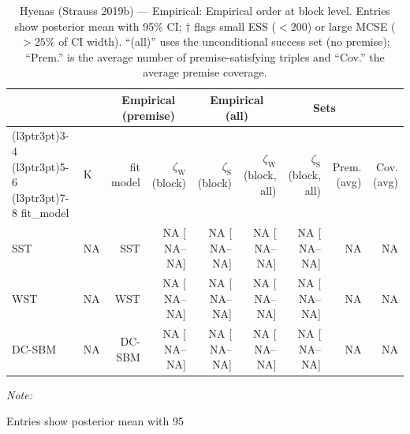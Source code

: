 \begin{table}
\centering
\caption{\label{tab:tab:hyenas-strauss-2019b-empirical-emp-block}Hyenas (Strauss 2019b) — Empirical: Empirical order at block level. Entries show posterior mean with 95\% CI; $\dagger$ flags small ESS ($<200$) or large MCSE ($>25\%$ of CI width). “(all)” uses the unconditional success set (no premise); “Prem.” is the average number of premise-satisfying triples and “Cov.” the average premise coverage.}
\centering
\begin{threeparttable}
\begin{tabular}[t]{llrrrrrrr}
\toprule
\multicolumn{2}{c}{ } & \multicolumn{2}{c}{Empirical (premise)} & \multicolumn{2}{c}{Empirical (all)} & \multicolumn{2}{c}{Sets} \\
\cmidrule(l{3pt}r{3pt}){3-4} \cmidrule(l{3pt}r{3pt}){5-6} \cmidrule(l{3pt}r{3pt}){7-8}
fit_model & K & fit model & $\zeta_{\mathrm{W}}$ (block) & $\zeta_{\mathrm{S}}$ (block) & $\zeta_{\mathrm{W}}$ (block, all) & $\zeta_{\mathrm{S}}$ (block, all) & Prem. (avg) & Cov. (avg)\\
\midrule
SST & NA & SST & NA [  NA--  NA] & NA [  NA--  NA] & NA [  NA--  NA] & NA [  NA--  NA] & NA & NA\\
WST & NA & WST & NA [  NA--  NA] & NA [  NA--  NA] & NA [  NA--  NA] & NA [  NA--  NA] & NA & NA\\
DC-SBM & NA & DC-SBM & NA [  NA--  NA] & NA [  NA--  NA] & NA [  NA--  NA] & NA [  NA--  NA] & NA & NA\\
\bottomrule
\end{tabular}
\begin{tablenotes}
\item \textit{Note: } 
\item Entries show posterior mean with 95%
\end{tablenotes}
\end{threeparttable}
\end{table}